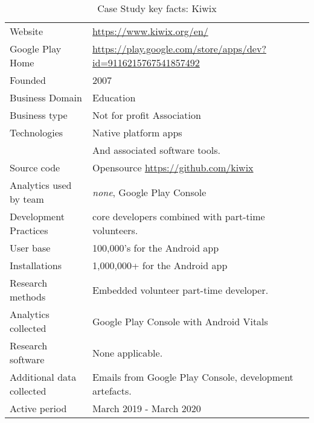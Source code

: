 {\renewcommand{\arraystretch}{0.8}%
\begin{table*}
    \centering
    \small
    \setlength{\tabcolsep}{6pt}
    \begin{tabular}{lp{9cm}}
       \toprule
       Website &\url{https://www.kiwix.org/en/} \\
       Google Play Home & \url{https://play.google.com/store/apps/dev?id=9116215767541857492} \\
       Founded & 2007 \\
       Business Domain & Education \\
       Business type & Not for profit Association \\
       Technologies  & Native platform apps \\
       & And associated software tools. \\
       Source code  & Opensource \url{https://github.com/kiwix} \\
       Analytics used by team & \textit{none}\footnotemark, Google Play Console \\
       Development Practices & core developers combined with part-time volunteers. \\
       \midrule
       User base & 100,000's for the Android app \\
       Installations & 1,000,000+ for the Android app \\
       \midrule
       Research methods &Embedded volunteer part-time developer\footnotemark. \\
       Analytics collected &Google Play Console with Android Vitals \\
       Research software & None applicable. \\
       Additional data collected &Emails from Google Play Console, development artefacts. \\
       Active period & March 2019 - March 2020 \\
       \bottomrule
    \end{tabular}
    \caption{Case Study key facts: Kiwix}
    \label{tab:kiwix_anaytics_overview}
\end{table*}
}


